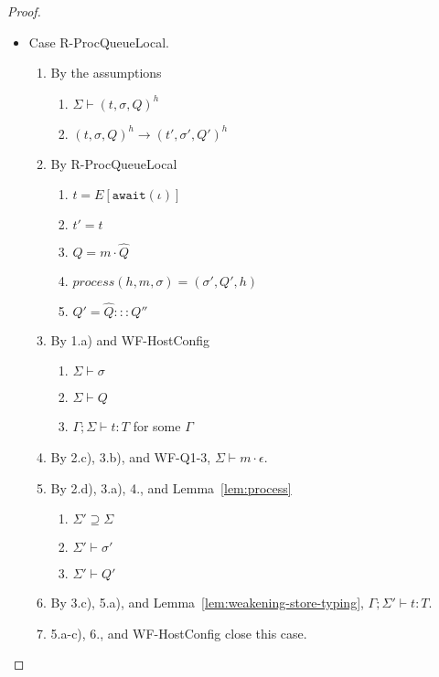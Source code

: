 \documentclass{article}
\theoremstyle{definition}
\begin{document}
\begin{proof}
\begin{itemize}
\item Case R-ProcQueueLocal.
\begin{enumerate}
\item By the assumptions
  \begin{enumerate}[label=(\alph*)]
  \item $\Sigma \vdash (t, \sigma, Q)^h$
  \item $(t, \sigma, Q)^h \longrightarrow (t', \sigma', Q')^h$
  \end{enumerate}
\item By R-ProcQueueLocal
  \begin{enumerate}[label=(\alph*)]
  \item $t = E[\texttt{await}(\iota)]$
  \item $t' = t$
  \item $Q = m \cdot \hat{Q}$
  \item $process(h, m, \sigma) = (\sigma', Q', h)$
  \item $Q' = \hat{Q} ::: Q''$
  \end{enumerate}
\item By 1.a) and WF-HostConfig
  \begin{enumerate}[label=(\alph*)]
  \item $\Sigma \vdash \sigma$
  \item $\Sigma \vdash Q$
  \item $\Gamma ; \Sigma \vdash t : T$ for some $\Gamma$
  \end{enumerate}
\item By 2.c), 3.b), and WF-Q1-3, $\Sigma \vdash m \cdot \epsilon$.
\item By 2.d), 3.a), 4., and Lemma~\ref{lem:process}
  \begin{enumerate}[label=(\alph*)]
  \item $\Sigma' \supseteq \Sigma$
  \item $\Sigma' \vdash \sigma'$
  \item $\Sigma' \vdash Q'$
  \end{enumerate}
\item By 3.c), 5.a), and Lemma~\ref{lem:weakening-store-typing}, $\Gamma ; \Sigma' \vdash t : T$.
\item 5.a-c), 6., and WF-HostConfig close this case.

\end{enumerate}


\end{itemize}
\end{proof}
\end{document}
